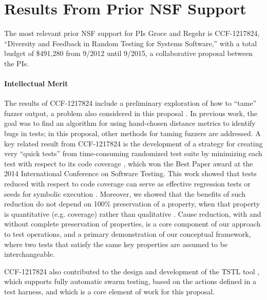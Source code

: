 \section{Results From Prior NSF Support}

The most relevant prior NSF support for PIs Groce and Regehr is
CCF-1217824, ``Diversity and Feedback in Random Testing for Systems
Software,'' with a total budget of \$491,280 from 9/2012 until 9/2015,
a collaborative proposal between the PIs.

\paragraph{Intellectual Merit}

The results of CCF-1217824 include a preliminary exploration of how to
``tame'' fuzzer output, a problem also considered in this proposal
\cite{PLDI13}.  In previous work, the goal was to find an algorithm
for using hand-chosen distance metrics to identify bugs in tests; in
this proposal, other methods for taming fuzzers are addressed.  A key related result from CCF-1217824
is the development of a strategy for creating very ``quick
tests'' from time-consuming randomized test suite by minimizing each
test with respect to its code coverage \cite{icst2014}, which won the
Best Paper award at the 2014 International Conference on Software
Testing. 
This work showed that tests reduced with respect to
code coverage can serve as effective regression tests or seeds for
symbolic execution \cite{stvrcausereduce,issta14}.  Moreover, we
showed that the benefits of such reduction do not depend on 100\%
preservation of a property, when that property is quantitative
(e.g. coverage) rather than qualitative \cite{ASEAdeq}.  Cause
reduction, with and without complete preservation of properties, is a
core component of our approach to test operations, and a primary
demonstration of our conceptual framework, where two tests that
satisfy the same key properties are assumed to be interchangeable.

CCF-1217824 also contributed to the design and development of the TSTL
tool \cite{NFM15,tstlsttt}, which supports fully automatic swarm
testing, based on the actions defined in a test harness, and which is
a core element of work for this proposal.

